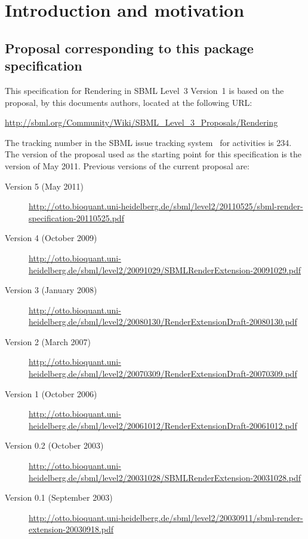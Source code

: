 
\section{Introduction and motivation} \label{intro} 


\subsection{Proposal corresponding to this package specification} 

This specification for Rendering in SBML Level~3 
Version~1 is based on the proposal, by this documents authors, located 
at the following URL: 
\begin{center} 
  \vspace*{1ex}\small 
  \url{http://sbml.org/Community/Wiki/SBML_Level_3_Proposals/Rendering} 
  \vspace*{1ex} 
\end{center} 

The tracking number in the SBML issue tracking system~\citep{tracker} 
for \RenderPackage activities is 234. The version of the proposal used 
as the starting point for this specification is the version of May 
2011. Previous versions of the current proposal are: 

\begin{description} 
  \item[Version 5 (May 2011)] 
  \item [] \small{\url{http://otto.bioquant.uni-heidelberg.de/sbml/level2/20110525/sbml-render-specification-20110525.pdf}} 
  \item[Version 4 (October 2009)] 
  \item [] \small{\url{http://otto.bioquant.uni-heidelberg.de/sbml/level2/20091029/SBMLRenderExtension-20091029.pdf}} 
  \item[Version 3 (January 2008)] 
  \item [] \small{\url{http://otto.bioquant.uni-heidelberg.de/sbml/level2/20080130/RenderExtensionDraft-20080130.pdf}} 
	\item[Version 2 (March 2007)] 
  \item [] \small{\url{http://otto.bioquant.uni-heidelberg.de/sbml/level2/20070309/RenderExtensionDraft-20070309.pdf}} 
	\item[Version 1 (October 2006)] 
  \item [] \small{\url{http://otto.bioquant.uni-heidelberg.de/sbml/level2/20061012/RenderExtensionDraft-20061012.pdf}} 
	\item[Version 0.2 (October 2003)] 
  \item [] \small{\url{http://otto.bioquant.uni-heidelberg.de/sbml/level2/20031028/SBMLRenderExtension-20031028.pdf}} 
	\item[Version 0.1 (September 2003)] 
  \item [] \small{\url{http://otto.bioquant.uni-heidelberg.de/sbml/level2/20030911/sbml-render-extension-20030918.pdf}} 
\end{description} 

